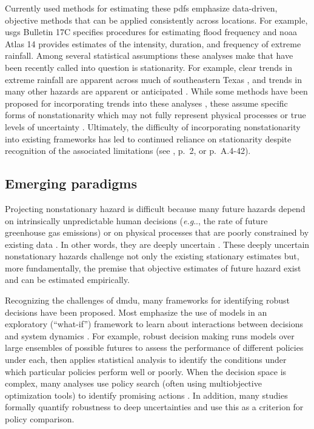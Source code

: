 \documentclass[11pt]{article}
\makeatletter
\DeclareRobustCommand\onedot{\futurelet\@let@token\@onedot}
\def\@onedot{\ifx\@let@token.\else.\null\fi\xspace}
\def\eg{\emph{e.g}\onedot} \def\Eg{\emph{E.g}\onedot}
\DeclareRobustCommand\onedot{\futurelet\@let@token\@onedot}
\def\@onedot{\ifx\@let@token.\else.\null\fi\xspace}
\def\eg{\emph{e.g}\onedot} \def\Eg{\emph{E.g}\onedot}
\makeatother
\begin{document}
Currently used methods for estimating these \glspl{pdf} emphasize data-driven, objective methods that can be applied consistently across locations.
For example, \gls{usgs} Bulletin 17C specifies procedures for estimating flood frequency and \gls{noaa} Atlas 14 provides estimates of the intensity, duration, and frequency of extreme rainfall.
Among several statistical assumptions these analyses make that have been recently called into question \citep[see][for a review]{Merz:2014gf} is stationarity.
For example, clear trends in extreme rainfall are apparent across much of southeastern Texas \citep{fagnant_spatiotemporal:2020,nielsen-gammon_txrainfall:2020}, and trends in many other hazards are apparent or anticipated \citep[see][for a comprehensive summary]{ipcc_impacts:2022}.
While some methods have been proposed for incorporating trends into these analyses \citep[see][for a review]{Salas:2018ge}, these assume specific forms of nonstationarity which may not fully represent physical processes or true levels of uncertainty \citep{DossGollin:2019,Montanari:2014hl,Serinaldi:2015bq}.
Ultimately, the difficulty of incorporating nonstationarity into existing frameworks has led to continued reliance on stationarity despite recognition of the associated limitations (see \cite{bulletin17c:2019}, p.~2, or \cite{atlas14_texas:2018} p.~A.4-42).

\subsection{Emerging paradigms}

Projecting nonstationary hazard is difficult because many future hazards depend on intrinsically unpredictable human decisions (\eg, the rate of future greenhouse gas emissions) or on physical processes that are poorly constrained by existing data \citep[\eg, collapse of the West Antarctic ice sheet; see][]{deconto_antarctica:2016}.
In other words, they are deeply uncertain \citep{keller_management:2021,walker_deep:2013,lempert_complex:2002}.
These deeply uncertain nonstationary hazards challenge not only the existing stationary estimates but, more fundamentally, the premise that objective estimates of future hazard exist and can be estimated empirically.

Recognizing the challenges of \gls{dmdu}, many frameworks for identifying robust decisions have been proposed.
Most emphasize the use of models in an exploratory (``what-if'') framework to learn about interactions between decisions and system dynamics \citep{bankes:1993}.
For example, robust decision making \citep{lempert_shaping:2003} runs models over large ensembles of possible futures to assess the performance of different policies under each, then applies statistical analysis to identify the conditions under which particular policies perform well or poorly.
When the decision space is complex, many analyses use policy search (often using multiobjective optimization tools) to identify promising actions \citep{kasprzyk:2013,kasprzyk_denovo:2012,hadka_mordm:2015}.
In addition, many studies formally quantify robustness to deep uncertainties \citep{herman:2015,mcphail_robustness:2019} and use this as a criterion for policy comparison.
\end{document}
